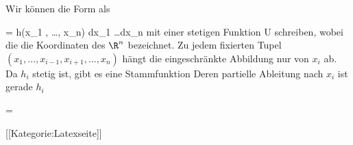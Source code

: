 Wir können die Form als

\mavergleichskettedisp
{\vergleichskette
{ \omega
}
{ =} { h(x_1 , \ldots , x_n) dx_1 \wedge \ldots \wedge dx_n
}
{ } {
}
{ } {
}
{ } {
}
}
{}{}{}
mit einer stetigen Funktion
 { U } {\R
} {}
schreiben, wobei die
 die Koordinaten des $\R^n$ bezeichnet. Zu jedem fixierten Tupel $(x_1 , \ldots , x_{i-1},x_{i+1} , \ldots , x_n)$ hängt die eingeschränkte Abbildung
 nur von $x_i$ ab. Da $h_i$ stetig ist, gibt es eine Stammfunktion
 Deren partielle Ableitung nach $x_i$ ist gerade $h_i$

 {  }

\mavergleichskettedisp
{\vergleichskette
{
}
{ =} {
}
{ } {
}
{ } {
}
{ } {
}
}
{}{}{}

 [[Kategorie:Latexseite]]
